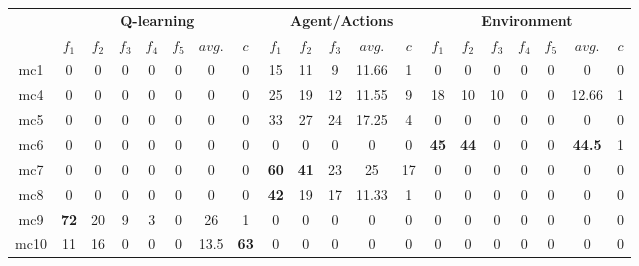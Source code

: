 \setlength{\tabcolsep}{4pt}
\begin{tabular*}{\linewidth}{ @{\extracolsep{\fill}}c | ccccccc | ccccc | ccccccc @{}}
\toprule
& \multicolumn{7}{|c|}{\textbf{Q-learning}} & \multicolumn{5}{c|}{\textbf{Agent/Actions}} & \multicolumn{7}{c}{\textbf{Environment}} \\

& $f_1$ & $f_2$  & $f_3$  & $f_4$ & $f_5$ & $avg.$ & $c$ 
& $f_1$ & $f_2$  & $f_3$  & $avg.$ & $c$
& $f_1$ & $f_2$  & $f_3$  & $f_4$ & $f_5$ & $avg.$ & $c$  \\
\midrule

mc1 &  0 & 0  &  0  &  0  &  0 &  0  &  0 
     & 15 & 11  &  9  &  11.66  &  1   
    &  0 & 0  &  0  &  0  &  0 &  0  &  0  \\

mc4 &  0 & 0  &  0  &  0  &  0 &  0  &  0
    &  25  &  19  &  12 &  11.55  &  9   
    &  18 & 10  &  10  &  0  &  0 &  12.66  &  1  \\

mc5 &  0 & 0  &  0  &  0  &  0 &  0  &  0 
     & 33 & 27  &  24  &  17.25  &  4   
     &  0 & 0  &  0  &  0  &  0 &  0  &  0  \\

mc6 &  0 & 0  &  0  &  0  &  0 &  0  &  0 
    & 0 & 0  &  0  &  0  &  0   
    &  \textbf{{\color{red}45}} & \textbf{{\color{red}44}}  &  0  &  0  &  0 &  \textbf{{\color{red}44.5}}  &  1  \\

mc7 &  0 & 0  &  0  &  0  &  0 &  0  &  0 
    & \textbf{{\color{red}60}} & \textbf{{\color{red}41}}  &  23  &  25  &  17       
    & 0 & 0  &  0  &  0  &  0 &  0  &  0  \\

mc8 &  0 & 0  &  0  &  0  &  0 &  0  &  0 
     & \textbf{{\color{red}42}} & 19  &  17  &  11.33  &  1   
    &  0 & 0  &  0  &  0  &  0 &  0  &  0  \\

mc9 &  \textbf{{\color{red}72}} & 20  &  9  &  3  &  0 &  26  &  1 
    & 0 & 0  &  0  &  0  &  0   
   &  0 & 0  &  0  &  0  &  0 &  0  &  0  \\

mc10 &  11 & 16  &  0  &  0  &  0 &  13.5  &  \textbf{{\color{red}63}}
    & 0 & 0  &  0  &  0  &  0   
    &  0 & 0  &  0  &  0  &  0 &  0  &  0  \\

\bottomrule
\end{tabular*}

